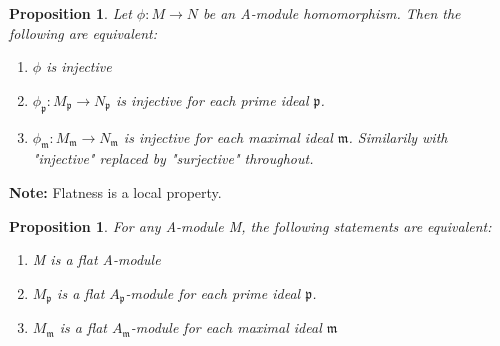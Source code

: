 \documentclass[]{report}
\newtheorem{prop}[theorem]{Proposition}
\begin{document}
\begin{prop}
    Let $\phi: M\rightarrow N$ be an A-module homomorphism. Then the following are equivalent:
    \begin{enumerate}
        \item $\phi$ is injective
        \item $\phi_\mathfrak{p}: M_\mathfrak{p} \rightarrow N_\mathfrak{p}$ is injective for each prime ideal $\mathfrak{p}$. 
        \item $\phi_\mathfrak{m}: M_\mathfrak{m} \rightarrow N_\mathfrak{m}$ is injective for each maximal ideal $\mathfrak{m}$. 
Similarily with "injective" replaced by "surjective" throughout. 
    \end{enumerate}
\end{prop}

\textbf{Note:} Flatness is a local property.

\begin{prop}
    For any A-module M, the following statements are equivalent:
    \begin{enumerate}
        \item M is a flat A-module
        \item $M_\mathfrak{p}$ is a flat $A_\mathfrak{p}$-module for each prime ideal $\mathfrak{p}$.
        \item $M_\mathfrak{m}$ is a flat $A_\mathfrak{m}$-module for each maximal ideal $\mathfrak{m}$
    \end{enumerate}
\end{prop}
\end{document}

